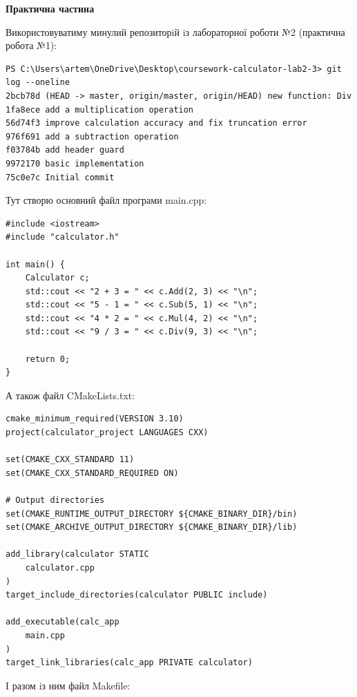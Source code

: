 \documentclass[a4paper,12pt]{article}
\begin{document}
    \vspace{1em}

    \begin{center} \textbf{\Large Практична частина} \end{center}

    Використовуватиму минулий репозиторiй iз лабораторної роботи №2 (практична робота №1):
    \begin{verbatim}
PS C:\Users\artem\OneDrive\Desktop\coursework-calculator-lab2-3> git log --oneline
2bcb78d (HEAD -> master, origin/master, origin/HEAD) new function: Div
1fa8ece add a multiplication operation
56d74f3 improve calculation accuracy and fix truncation error
976f691 add a subtraction operation
f03784b add header guard
9972170 basic implementation
75c0e7c Initial commit
    \end{verbatim}

    Тут створю основний файл програми main.cpp:

    \begin{verbatim}
#include <iostream>
#include "calculator.h"

int main() {
    Calculator c;
    std::cout << "2 + 3 = " << c.Add(2, 3) << "\n";
    std::cout << "5 - 1 = " << c.Sub(5, 1) << "\n";
    std::cout << "4 * 2 = " << c.Mul(4, 2) << "\n";
    std::cout << "9 / 3 = " << c.Div(9, 3) << "\n";

    return 0;
}
    \end{verbatim}

    А також файл CMakeLists.txt:

    \begin{verbatim}
cmake_minimum_required(VERSION 3.10)
project(calculator_project LANGUAGES CXX)

set(CMAKE_CXX_STANDARD 11)
set(CMAKE_CXX_STANDARD_REQUIRED ON)

# Output directories
set(CMAKE_RUNTIME_OUTPUT_DIRECTORY ${CMAKE_BINARY_DIR}/bin)
set(CMAKE_ARCHIVE_OUTPUT_DIRECTORY ${CMAKE_BINARY_DIR}/lib)

add_library(calculator STATIC
    calculator.cpp
)
target_include_directories(calculator PUBLIC include)

add_executable(calc_app
    main.cpp
)
target_link_libraries(calc_app PRIVATE calculator)
    \end{verbatim}

    I разом iз ним файл Makefile:
\end{document}
